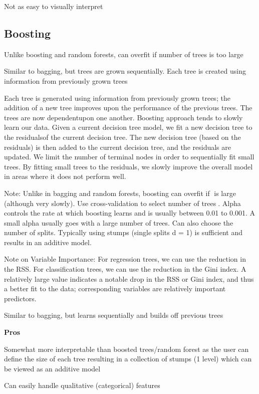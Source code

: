 \documentclass[]{book}
\begin{document}
Not as easy to visually interpret

\hypertarget{boosting}{%
\subsection{Boosting}\label{boosting}}

Unlike boosting and random forests, can overfit if number of trees is too large

Similar to bagging, but trees are grown sequentially. Each tree is created using information from previously grown trees

Each tree is generated using information from previously grown trees; the addition of a new tree improves upon the performance of the previous trees. The trees are now dependentupon one another. Boosting approach tends to slowly learn our data. Given a current decision tree model, we fit a new decision tree to the residualsof the current decision tree. The new decision tree (based on the residuals) is then added to the current decision tree, and the residuals are updated. We limit the number of terminal nodes in order to sequentially fit small trees. By fitting small trees to the residuals, we slowly improve the overall model in areas where it does not perform well.

Note: Unlike in bagging and random forests, boosting can overfit if ᫦is large (although very slowly). Use cross-validation to select number of trees᫦. Alpha controls the rate at which boosting learns and is usually between 0.01 to 0.001. A small alpha usually goes with a large number of trees. Can also choose the number of splits. Typically using stumps (single splits d = 1) is sufficient and results in an additive model.

Note on Variable Importance: For regression trees, we can use the reduction in the RSS. For classification trees, we can use the reduction in the Gini index. A relatively large value indicates a notable drop in the RSS or Gini index, and thus a better fit to the data; corresponding variables are relatively important predictors.

Similar to bagging, but learns sequentially and builds off previous trees

\textbf{Pros}

Somewhat more interpretable than boosted trees/random forest as the user can define the size of each tree resulting in a collection of stumps (1 level) which can be viewed as an additive model

Can easily handle qualitative (categorical) features
\end{document}

